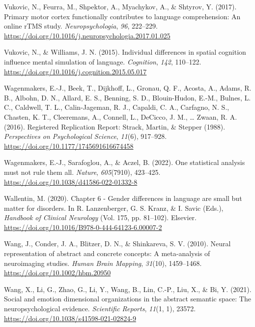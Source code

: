 \documentclass[
  12pt,
  man,floatsintext]{apa7}
\newlength{\cslhangindent}
\newlength{\cslentryspacingunit} %
\newenvironment{CSLReferences}[2] %
 {%
  \setlength{\parindent}{0pt}
  \ifodd #1
  \let\oldpar\par
  \def\par{\hangindent=\cslhangindent\oldpar}
  \fi
  \setlength{\parskip}{#2\cslentryspacingunit}
 }%
 {}
\begin{document}
\begin{CSLReferences}{1}{0}
\leavevmode{}%
Vukovic, N., Feurra, M., Shpektor, A., Myachykov, A., \& Shtyrov, Y. (2017). Primary motor cortex functionally contributes to language comprehension: {An} online {rTMS} study. \emph{Neuropsychologia}, \emph{96}, 222--229. \url{https://doi.org/10.1016/j.neuropsychologia.2017.01.025}

\leavevmode{}%
Vukovic, N., \& Williams, J. N. (2015). Individual differences in spatial cognition influence mental simulation of language. \emph{Cognition}, \emph{142}, 110--122. \url{https://doi.org/10.1016/j.cognition.2015.05.017}

\leavevmode{}%
Wagenmakers, E.-J., Beek, T., Dijkhoff, L., Gronau, Q. F., Acosta, A., Adams, R. B., Albohn, D. N., Allard, E. S., Benning, S. D., Blouin-Hudon, E.-M., Bulnes, L. C., Caldwell, T. L., Calin-Jageman, R. J., Capaldi, C. A., Carfagno, N. S., Chasten, K. T., Cleeremans, A., Connell, L., DeCicco, J. M., \ldots{} Zwaan, R. A. (2016). Registered {Replication Report}: {Strack}, {Martin}, \& {Stepper} (1988). \emph{Perspectives on Psychological Science}, \emph{11}(6), 917--928. \url{https://doi.org/10.1177/1745691616674458}

\leavevmode{}%
Wagenmakers, E.-J., Sarafoglou, A., \& Aczel, B. (2022). One statistical analysis must not rule them all. \emph{Nature}, \emph{605}(7910), 423--425. \url{https://doi.org/10.1038/d41586-022-01332-8}

\leavevmode{}%
Wallentin, M. (2020). Chapter 6 - {Gender} differences in language are small but matter for disorders. In R. Lanzenberger, G. S. Kranz, \& I. Savic (Eds.), \emph{Handbook of {Clinical Neurology}} (Vol. 175, pp. 81--102). {Elsevier}. \url{https://doi.org/10.1016/B978-0-444-64123-6.00007-2}

\leavevmode{}%
Wang, J., Conder, J. A., Blitzer, D. N., \& Shinkareva, S. V. (2010). Neural representation of abstract and concrete concepts: {A} meta-analysis of neuroimaging studies. \emph{Human Brain Mapping}, \emph{31}(10), 1459--1468. \url{https://doi.org/10.1002/hbm.20950}

\leavevmode{}%
Wang, X., Li, G., Zhao, G., Li, Y., Wang, B., Lin, C.-P., Liu, X., \& Bi, Y. (2021). Social and emotion dimensional organizations in the abstract semantic space: The neuropsychological evidence. \emph{Scientific Reports}, \emph{11}(1, 1), 23572. \url{https://doi.org/10.1038/s41598-021-02824-9}


\end{CSLReferences}
\end{document}
